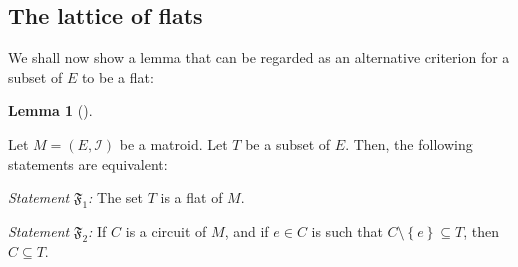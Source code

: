\documentclass[numbers=enddot,12pt,final,onecolumn,notitlepage]{scrartcl}%
\theoremstyle{definition}
\newtheorem{lem}[theo]{Lemma}
\newenvironment{lemma}[1][]
{\begin{lem}[#1]\begin{leftbar}}
{\end{leftbar}\end{lem}}
\begin{document}
\subsection{The lattice of flats}

We shall now show a lemma that can be regarded as an alternative criterion for
a subset of $E$ to be a flat:

\begin{lemma}
\label{lem.matroid.flat-crit}Let $M=\left(  E,\mathcal{I}\right)  $ be a
matroid. Let $T$ be a subset of $E$. Then, the following statements are equivalent:

\textit{Statement }$\mathfrak{F}_{1}$\textit{:} The set $T$ is a flat of $M$.

\textit{Statement }$\mathfrak{F}_{2}$\textit{:} If $C$ is a circuit of $M$,
and if $e\in C$ is such that $C\setminus\left\{  e\right\}  \subseteq T$, then
$C\subseteq T$.
\end{lemma}
\end{document}
